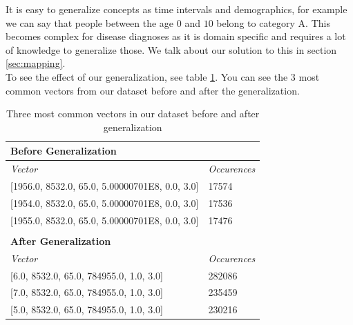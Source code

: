 It is easy to generalize concepts as time intervals and demographics, for example we can say that people between the age $0$ and $10$ belong to category A. This becomes complex for disease diagnoses as it is domain specific and requires a lot of knowledge to generalize those. We talk about our solution to this in section \ref{sec:mapping}. \\

To see the effect of our generalization, see table \ref{tab:general}. You can see the $3$ most common vectors from our dataset before and after the generalization. \\

\begin{table}[!htb]
\centering

\label{tab:general}
\begin{tabular}{ll}
\cline{1-1}
\multicolumn{1}{|l|}{\textbf{Before Generalization}}                     & {\ul }                                   \\ \hline
\multicolumn{1}{|l|}{\textit{Vector}}                                    & \multicolumn{1}{l|}{\textit{Occurences}} \\ \hline
\multicolumn{1}{|l|}{{[}1956.0, 8532.0, 65.0, 5.00000701E8, 0.0, 3.0{]}} & \multicolumn{1}{l|}{17574}               \\ \hline
\multicolumn{1}{|l|}{{[}1954.0, 8532.0, 65.0, 5.00000701E8, 0.0, 3.0{]}} & \multicolumn{1}{l|}{17536}               \\ \hline
\multicolumn{1}{|l|}{{[}1955.0, 8532.0, 65.0, 5.00000701E8, 0.0, 3.0{]}} & \multicolumn{1}{l|}{17476}               \\ \hline
                                                                         &                                          \\ \cline{1-1}
\multicolumn{1}{|l|}{\textbf{After Generalization}}                      &                                          \\ \hline
\multicolumn{1}{|l|}{\textit{Vector}}                                    & \multicolumn{1}{l|}{\textit{Occurences}} \\ \hline
\multicolumn{1}{|l|}{{[}6.0, 8532.0, 65.0, 784955.0, 1.0, 3.0{]}}        & \multicolumn{1}{l|}{282086}              \\ \hline
\multicolumn{1}{|l|}{{[}7.0, 8532.0, 65.0, 784955.0, 1.0, 3.0{]}}        & \multicolumn{1}{l|}{235459}              \\ \hline
\multicolumn{1}{|l|}{{[}5.0, 8532.0, 65.0, 784955.0, 1.0, 3.0{]}}        & \multicolumn{1}{l|}{230216}              \\ \hline
\end{tabular}

\caption{Three most common vectors in our dataset before and after generalization}
\end{table}


